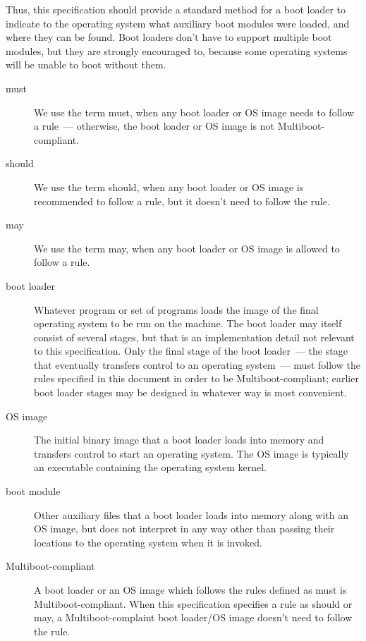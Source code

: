 Thus, this specification should provide a standard method for a boot loader to
indicate to the operating system what auxiliary boot modules were loaded, and
where they can be found. Boot loaders don't have to support multiple boot
modules, but they are strongly encouraged to, because some operating systems
will be unable to boot without them.

\secup


\begin{description}

\item[must]
We use the term must, when any boot loader or OS image needs to follow a rule\
--- otherwise, the boot loader or OS image is not Multiboot-compliant.

\item[should]
We use the term should, when any boot loader or OS image is recommended to
follow a rule, but it doesn't need to follow the rule.

\item[may]
We use the term may, when any boot loader or OS image is allowed to follow a
rule.

\item[boot loader]
Whatever program or set of programs loads the image of the final operating
system to be run on the machine. The boot loader may itself consist of several
stages, but that is an implementation detail not relevant to this specification.
Only the final stage of the boot loader\ --- the stage that eventually transfers
control to an operating system\ --- must follow the rules specified in this
document in order to be Multiboot-compliant; earlier boot loader stages may be
designed in whatever way is most convenient.

\item[OS image]
The initial binary image that a boot loader loads into memory and transfers
control to start an operating system. The OS image is typically an executable
containing the operating system kernel.

\item[boot module]
Other auxiliary files that a boot loader loads into memory along with an OS
image, but does not interpret in any way other than passing their locations to
the operating system when it is invoked.

\item[Multiboot-compliant]
A boot loader or an OS image which follows the rules defined as must is
Multiboot-compliant. When this specification specifies a rule as should or may,
a Multiboot-complaint boot loader/OS image doesn't need to follow the rule.


\end{description}
